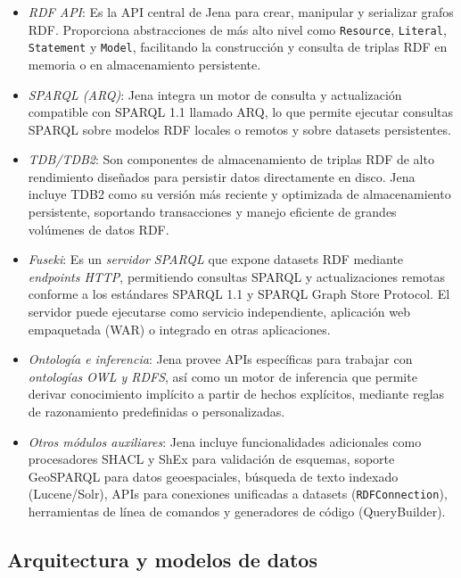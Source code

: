 \documentclass{article}
\begin{document}
\begin{itemize}
    \item \textit{RDF API}: Es la API central de Jena para crear, manipular y serializar grafos RDF. Proporciona abstracciones de más alto nivel como \texttt{Resource}, \texttt{Literal}, \texttt{Statement} y \texttt{Model}, facilitando la construcción y consulta de triplas RDF en memoria o en almacenamiento persistente.
    \item \textit{SPARQL (ARQ)}: Jena integra un motor de consulta y actualización compatible con SPARQL 1.1 llamado ARQ, lo que permite ejecutar consultas SPARQL sobre modelos RDF locales o remotos y sobre datasets persistentes.
    \item \textit{TDB/TDB2}: Son componentes de almacenamiento de triplas RDF de alto rendimiento diseñados para persistir datos directamente en disco. Jena incluye TDB2 como su versión más reciente y optimizada de almacenamiento persistente, soportando transacciones y manejo eficiente de grandes volúmenes de datos RDF.

    \item \textit{Fuseki}: Es un \textit{servidor SPARQL} que expone datasets RDF mediante \textit{endpoints HTTP}, permitiendo consultas SPARQL y actualizaciones remotas conforme a los estándares SPARQL 1.1 y SPARQL Graph Store Protocol. El servidor puede ejecutarse como servicio independiente, aplicación web empaquetada (WAR) o integrado en otras aplicaciones.

    \item \textit{Ontología e inferencia}: Jena provee APIs específicas para trabajar con \textit{ontologías OWL y RDFS}, así como un motor de inferencia que permite derivar conocimiento implícito a partir de hechos explícitos, mediante reglas de razonamiento predefinidas o personalizadas.

    \item \textit{Otros módulos auxiliares}: Jena incluye funcionalidades adicionales como procesadores SHACL y ShEx para validación de esquemas, soporte GeoSPARQL para datos geoespaciales, búsqueda de texto indexado (Lucene/Solr), APIs para conexiones unificadas a datasets (\texttt{RDFConnection}), herramientas de línea de comandos y generadores de código (QueryBuilder).
\end{itemize}

\subsection{Arquitectura y modelos de datos}
\end{document}
